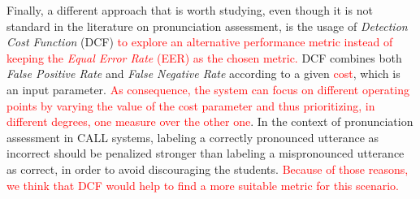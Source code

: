 Finally, a different approach
that is worth studying, even though it is not standard in the literature
on pronunciation assessment,
is the usage of \textit{Detection Cost Function} (DCF) %
\textcolor{red}{to explore an alternative performance metric
instead of keeping the \textit{Equal Error Rate} (EER) as the chosen metric.}
DCF combines both \textit{False Positive Rate} and \textit{False Negative Rate}
according to a given \textcolor{red}{cost}, which is an input parameter.
\textcolor{red}{As consequence, the system can focus on different operating points
by varying the value of the cost parameter and thus prioritizing,
in different degrees, one measure over the other one}.
In the context of pronunciation assessment in
CALL systems, labeling a correctly pronounced utterance as incorrect should be
penalized stronger than labeling a mispronounced utterance as correct, in order
to avoid discouraging the students. \textcolor{red}{Because of those reasons,
we think that DCF
would help to find a more suitable metric for this scenario.}


